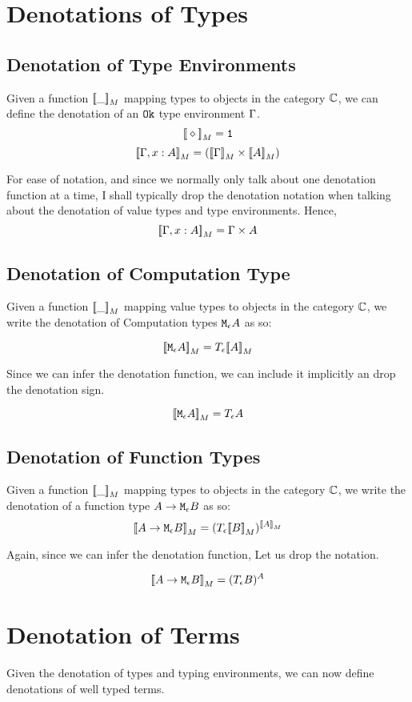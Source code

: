 \documentclass{report}
\begin{document}
\section{Denotations of Types}
\subsection{Denotation of Type Environments}
Given a function ${\bf [\![}\_{\bf ]\!]}_M$ mapping types to objects in the category $\mathbb{C}$, we can define the denotation of an $\texttt{Ok}$ type environment $\Gamma$.
$${\bf [\![}\diamond{\bf ]\!]}_M = \texttt{1}$$
$${\bf [\![}\Gamma, x: A{\bf ]\!]}_M = ({\bf [\![}\Gamma{\bf ]\!]}_M\times{\bf [\![}A{\bf ]\!]}_M) $$

For ease of notation, and since we normally only talk about one denotation function at a time, I shall typically drop the denotation notation when talking about the denotation of value types and type environments. Hence, $${\bf [\![}\Gamma, x: A{\bf ]\!]}_M = \Gamma \times A$$

\subsection{Denotation of Computation Type}
Given a function ${\bf [\![}\_{\bf ]\!]}_M$ mapping value types to objects in the category $\mathbb{C}$, we write the denotation of Computation types $\texttt{M}_{\epsilon}{A}$ as so:

$${\bf [\![}\texttt{M}_{\epsilon}{A}{\bf ]\!]}_M = T_{\epsilon}{{\bf [\![}A{\bf ]\!]}_M}$$

Since we can infer the denotation function, we can include it implicitly an drop the denotation sign.

$${\bf [\![}\texttt{M}_{\epsilon}{A}{\bf ]\!]}_M = T_{\epsilon}{A}$$

\subsection{Denotation of Function Types}
Given a function ${\bf [\![}\_{\bf ]\!]}_M$ mapping types to objects in the category $\mathbb{C}$, we write the denotation of a function type $A \rightarrow \texttt{M}_{\epsilon}{B}$ as so:
$${\bf [\![}A \rightarrow \texttt{M}_{\epsilon}{B}{\bf ]\!]}_M = (T_{\epsilon}{{\bf [\![}B{\bf ]\!]}_M})^{{\bf [\![}A{\bf ]\!]}_M}$$

Again, since we can infer the denotation function, Let us drop the notation.

$${\bf [\![}A \rightarrow \texttt{M}_{\epsilon}{B}{\bf ]\!]}_M = (T_{\epsilon}{B})^A$$



\section{Denotation of Terms}
Given the denotation of types and typing environments, we can now define denotations of well typed terms.
\end{document}
